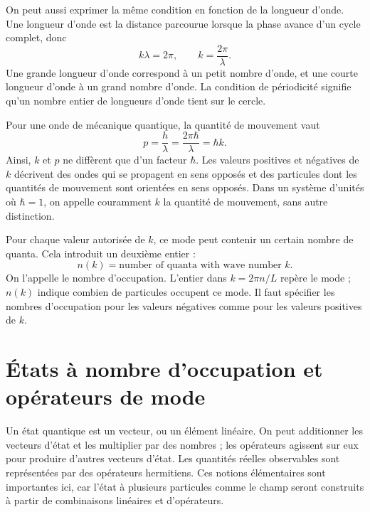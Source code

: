 On peut aussi exprimer la même condition en fonction de la longueur d’onde. Une longueur d’onde est la distance parcourue lorsque la phase avance d’un cycle complet, donc
\begin{equation}
k\lambda=2\pi,
\qquad
k=\frac{2\pi}{\lambda}.
\end{equation}
Une grande longueur d’onde correspond à un petit nombre d’onde, et une courte longueur d’onde à un grand nombre d’onde. La condition de périodicité signifie qu’un nombre entier de longueurs d’onde tient sur le cercle.

Pour une onde de mécanique quantique, la quantité de mouvement vaut
\begin{equation}
p=\frac{h}{\lambda}
=\frac{2\pi\hbar}{\lambda}
=\hbar k.
\end{equation}
Ainsi, \(k\) et \(p\) ne diffèrent que d’un facteur \(\hbar\). Les valeurs positives et négatives de \(k\) décrivent des ondes qui se propagent en sens opposés et des particules dont les quantités de mouvement sont orientées en sens opposés. Dans un système d’unités où \(\hbar=1\), on appelle couramment \(k\) la quantité de mouvement, sans autre distinction.

Pour chaque valeur autorisée de \(k\), ce mode peut contenir un certain nombre de quanta. Cela introduit un deuxième entier :
\begin{equation}
n(k)=\text{number of quanta with wave number }k.
\end{equation}
On l’appelle le nombre d’occupation. L’entier dans \(k=2\pi n/L\) repère le mode ; \(n(k)\) indique combien de particules occupent ce mode. Il faut spécifier les nombres d’occupation pour les valeurs négatives comme pour les valeurs positives de \(k\).

\begin{classroomqa}
\end{classroomqa}

\section{États à nombre d’occupation et opérateurs de mode}

Un état quantique est un vecteur, ou un élément linéaire. On peut additionner les vecteurs d’état et les multiplier par des nombres ; les opérateurs agissent sur eux pour produire d’autres vecteurs d’état. Les quantités réelles observables sont représentées par des opérateurs hermitiens. Ces notions élémentaires sont importantes ici, car l’état à plusieurs particules comme le champ seront construits à partir de combinaisons linéaires et d’opérateurs.

